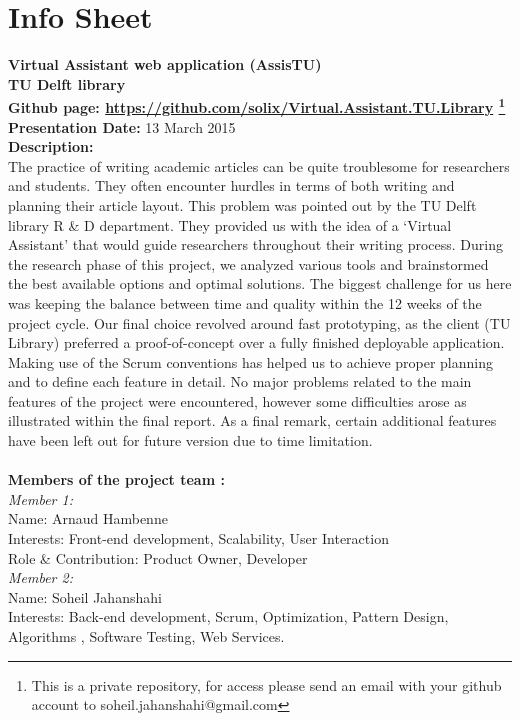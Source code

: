 \chapter{Info Sheet}    
\textbf{Virtual Assistant web application (AssisTU)\\}
\textbf{\small{TU Delft library\\}}
\textbf{Github page: \url{https://github.com/solix/Virtual.Assistant.TU.Library} \footnote{This is a private repository, for access please send an email with your github account to soheil.jahanshahi@gmail.com}\\} 
\textbf{Presentation Date: } 13 March 2015\\ 
\bigskip
\textbf{Description: \\}
The practice of writing academic articles can be quite troublesome for researchers and students. They often encounter hurdles in terms of both writing  and planning their article layout. This problem was pointed out by the TU Delft library R \& D department. They provided us with the idea of a `Virtual Assistant' that would guide researchers throughout their writing process. During the research phase of this project, we analyzed various tools and brainstormed the best available options and optimal solutions. The biggest challenge for us here was keeping the balance between time and quality within the 12 weeks of the project cycle. Our final choice revolved around fast prototyping, as the client (TU Library) preferred a proof-of-concept over a fully finished deployable application. Making use of the Scrum conventions has helped us to achieve proper planning and to define each feature in detail. No major problems related to the main features of the project were encountered, however some difficulties arose as illustrated within the final report. As a final remark, certain additional features have been left out for future version due to time limitation.\\\\
 \textbf{Members of the project team :\\}
 \textit{Member 1: \\}
	Name: Arnaud Hambenne\\
	Interests: Front-end development, Scalability, User Interaction\\ 
	Role \& Contribution: Product Owner, Developer\\
   \textit{Member 2: \\}
   Name: Soheil Jahanshahi\\
   Interests: Back-end development, Scrum, Optimization, Pattern Design, Algorithms , Software Testing, Web Services.\\ 
